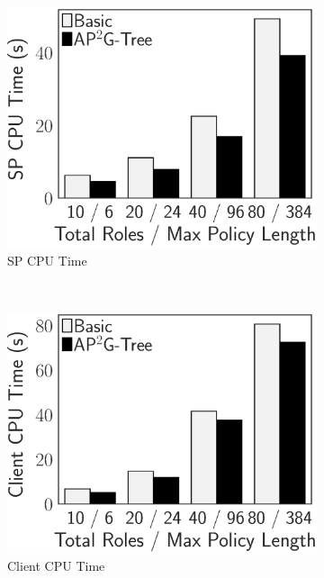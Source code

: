 \begin{figure}[t]
    \centering
    \begin{subfigure}{.33\linewidth}
        \includegraphics[height=\ht\figbox]{exp-figs/access-control/policy_2_sp.eps}
        \caption{SP CPU Time}
    \end{subfigure}~%
    \begin{subfigure}{.33\linewidth}
        \includegraphics[height=\ht\figbox]{exp-figs/access-control/policy_2_user.eps}
        \caption{Client CPU Time}
    \end{subfigure}~%
    \begin{subfigure}{.33\linewidth}

\end{subfigure}
\end{figure}
